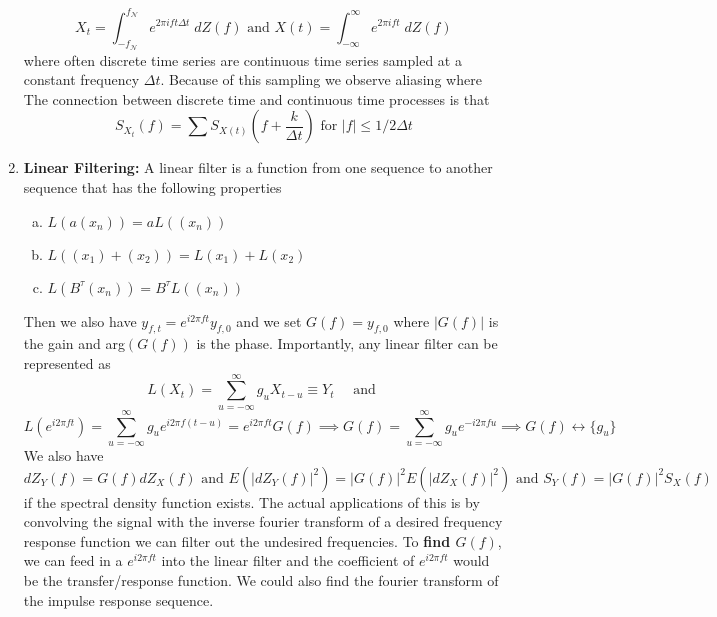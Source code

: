 \documentclass{article}
\begin{document}
\begin{enumerate}
    \[
    X_t = \int_{-f_\mathcal{N}}^{f_\mathcal{N}} e^{2\pi i ft \Delta t} \; dZ(f) \text{ and } X(t) = \int_{-\infty}^{\infty} e^{2\pi i ft}\;dZ(f)
    \]
    where often discrete time series are continuous time series sampled at a constant frequency \(\Delta t\). Because of this sampling we observe aliasing where The connection between discrete time and continuous time processes is that
    \[
    S_{X_t}(f) = \sum S_{X(t)}\left(f + \frac{k}{\Delta t} \right) \text{ for } |f|\leq 1/2\Delta t
    \]
    \item \textbf{Linear Filtering:} A linear filter is a function from one sequence to another sequence that has the following properties
    \begin{enumerate}[a.]
        \item \(L(a(x_n)) = aL((x_n))\)
        \item \(L((x_1)+(x_2)) = L(x_1) + L(x_2)\)
        \item \(L(B^\tau(x_n))= B^\tau L((x_n))\)
    \end{enumerate}
    Then we also have \(y_{f,t}= e^{i 2\pi f t}y_{f,0}\) and we set \(G(f) = y_{f,0}\) where \(|G(f)|\) is the gain and arg\((G(f))\) is the phase. Importantly, any linear filter can be represented as
    \[
    L(X_t) = \sum_{u=- \infty}^{\infty} g_uX_{t-u} \equiv Y_t \quad \text{ and }
    \]
    \[ 
    L(e^{i 2\pi ft}) 
    = \sum_{u = -\infty}^{\infty} g_u e^{i 2 \pi f (t -u)} 
    = e^{i 2 \pi f t}G(f) \implies G(f)
    = \sum_{u = -\infty}^{\infty} g_u e^{-i 2 \pi f u} \implies G(f) \leftrightarrow \{g_u\}
    \]
    We also have 
    \[
    dZ_Y(f)=G(f)dZ_X(f) \text{ and } E(|dZ_Y(f)|^2) = |G(f)|^2E(|dZ_X(f)|^2) \text{ and } S_Y(f) = |G(f)|^2S_X(f)
    \]
    if the spectral density function exists. The actual applications of this is by convolving the signal with the inverse fourier transform of a desired frequency response function we can filter out the undesired frequencies. To \textbf{find \(G(f)\)}, we can feed in a \(e^{i2 \pi ft}\) into the linear filter and the coefficient of \(e^{i2 \pi ft}\) would be the transfer/response function. We could also find the fourier transform of the impulse response sequence.


\end{enumerate}
\end{document}
